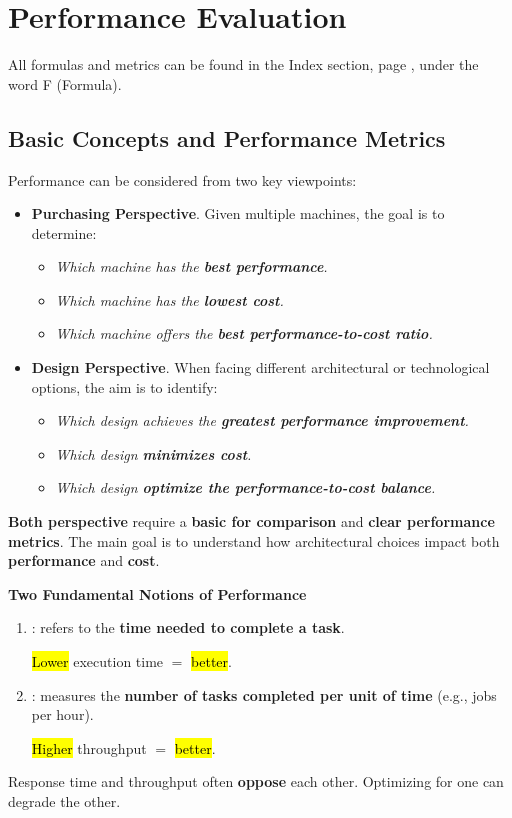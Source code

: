 \section{Performance Evaluation}

All formulas and metrics can be found in the Index section, page , under the word F (Formula).

\subsection{Basic Concepts and Performance Metrics}

Performance can be considered from two key viewpoints:
\begin{itemize}
  \item \textbf{Purchasing Perspective}. Given multiple machines, the goal is to determine:
  \begin{itemize}
    \item \emph{Which machine has the \textbf{best performance}.}
    \item \emph{Which machine has the \textbf{lowest cost}.}
    \item \emph{Which machine offers the \textbf{best performance-to-cost ratio}.}
  \end{itemize}
  
  \item \textbf{Design Perspective}. When facing different architectural or technological options, the aim is to identify:
  \begin{itemize}
    \item \emph{Which design achieves the \textbf{greatest performance improvement}.}
    \item \emph{Which design \textbf{minimizes cost}.}
    \item \emph{Which design \textbf{optimize the performance-to-cost balance}.}
  \end{itemize}
\end{itemize}
\textbf{Both perspective} require a \textbf{basic for comparison} and \textbf{clear performance metrics}. The main goal is to understand how architectural choices impact both \textbf{performance} and \textbf{cost}.

\highspace
\begin{flushleft}
  \textcolor{Green3}{ \textbf{Two Fundamental Notions of Performance}}
\end{flushleft}
\begin{enumerate}
  \item {}: refers to the \textbf{time needed to complete a task}.
  
  \hl{Lower} execution time $=$ \hl{better}.

  
  \item {}: measures the \textbf{number of tasks completed per unit of time} (e.g., jobs per hour).
  
  \hl{Higher} throughput $=$ \hl{better}.
\end{enumerate}
Response time and throughput often \textbf{oppose} each other. Optimizing for one can degrade the other.

